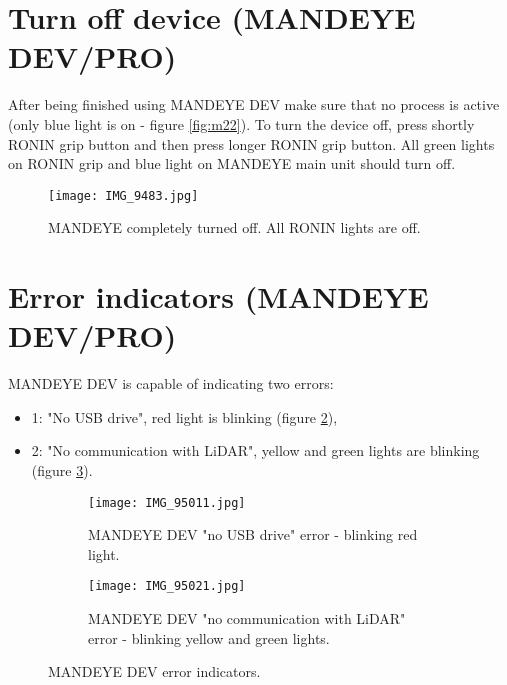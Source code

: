 \pagebreak
\section{Turn off device (MANDEYE DEV/PRO)}
 After being finished using MANDEYE DEV make sure that no process is active (only blue light is on - figure \ref{fig:m22}). To turn the device off, press shortly RONIN grip button and then press longer RONIN grip button. All green lights on RONIN grip and blue light on MANDEYE main unit should turn off.
 \begin{figure}[H]
 	\centering
 	\texttt{[image: IMG\_9483.jpg]}
 	\caption{MANDEYE completely turned off. All RONIN lights are off.}
 	\label{fig:mandeye_hardware5}
 \end{figure}

\pagebreak
\section{Error indicators (MANDEYE DEV/PRO)}
\label{section:errors}
MANDEYE DEV is capable of indicating two errors:
\begin{itemize}
	\item 1: "No USB drive", red light is blinking (figure \ref{fig:m61}),
	\item 2: "No communication with LiDAR", yellow and green lights are blinking (figure \ref{fig:m62}).
\end{itemize}

\begin{figure}[H]
	\centering
	\begin{subfigure}[b]{0.45\textwidth}
		\centering
		\texttt{[image: IMG\_95011.jpg]}
		\caption{MANDEYE DEV "no USB drive" error - blinking red light.}
		\label{fig:m61}
	\end{subfigure}
	\hfill
	\begin{subfigure}[b]{0.45\textwidth}
		\centering
		\texttt{[image: IMG\_95021.jpg]}
		\caption{MANDEYE DEV "no communication with LiDAR" error - blinking yellow and green lights.}
		\label{fig:m62}
	\end{subfigure}
	\caption{MANDEYE DEV error indicators.}
	\label{fig:mandeye_harware6}
\end{figure}
	
